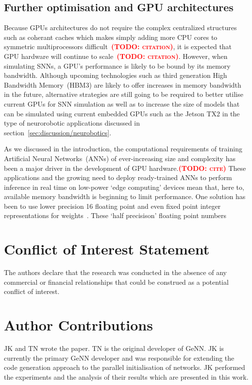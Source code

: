 \documentclass[utf8]{frontiersSCNS} %
\newcommand{\todo}[1]{\textbf{\textsc{\textcolor{red}{(TODO: #1)}}}}
\begin{document}
\subsection{Further optimisation and GPU architectures}
Because GPUs architectures do not require the complex centralized structures such as coherant caches which makes simply adding more CPU cores to symmetric multiprocessors difficult~\todo{citation}, it is expected that GPU hardware will continue to scale~\todo{citation}.
However, when simulating SNNs, a GPU's performance is likely to be bound by its memory bandwidth.
Although upcoming technologies such as third generation High Bandwidth Memory~(HBM3) are likely to offer increases in memory bandwidth in the future, alternative strategies are still going to be required to better utilise current GPUs for SNN simulation as well as to increase the size of models that can be simulated using current embedded GPUs such as the Jetson TX2 in the type of neurorobotic applications discussed in section~\ref{sec:discussion/neurobotics}.

As we discussed in the introduction, the computational requirements of training Artificial Neural Networks~(ANNs) of ever-increasing size and complexity has been a major driver in the development of GPU hardware.\todo{cite}
These applications and the growing need to deploy ready-trained ANNs to perform inference in real time on low-power `edge computing' devices mean that, here to, available memory bandwidth is beginning to limit performance.
One solution has been to use lower precision \SI{16}{\bit} floating point and even fixed point integer representations for weights~\citep{Micikevicius2017}.
These `half precisison' floating point numbers 

\section*{Conflict of Interest Statement}
The authors declare that the research was conducted in the absence of any commercial or financial relationships that could be construed as a potential conflict of interest.

\section*{Author Contributions}
JK and TN wrote the paper.
TN is the original developer of GeNN.
JK is currently the primary GeNN developer and was responsible for extending the code generation approach to the parallel initialisation of networks.
JK performed the experiments and the analysis of their results which are presented in this work.
\end{document}
